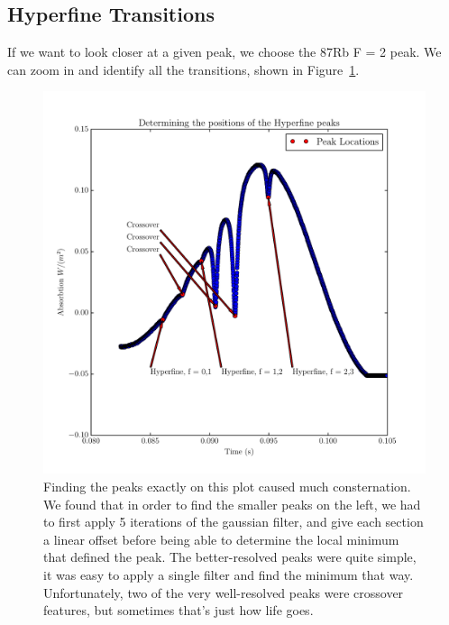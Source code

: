 \documentclass{article}
\begin{document}
  \subsection{Hyperfine Transitions}
  If we want to look closer at a given peak, we choose the 87Rb F = 2 peak.  We can zoom in and identify all the transitions, shown in Figure~\ref{hyperfine}.

  \hspace{.25cm}

  \begin{figure}[!htb]
    \centering
    \includegraphics[scale=.75]{../plots/hyperfine.pdf}
    \caption{Finding the peaks exactly on this plot caused much consternation.  We found that in order to find the smaller peaks on the left, we had to first apply 5 iterations of the gaussian filter, and give each section a linear offset before being able to determine the local minimum that defined the peak.  The better-resolved peaks were quite simple, it was easy to apply a single filter and find the minimum that way.  Unfortunately, two of the very well-resolved peaks were crossover features, but sometimes that's just how life goes.}
    \label{hyperfine}
  \end{figure}
\end{document}
